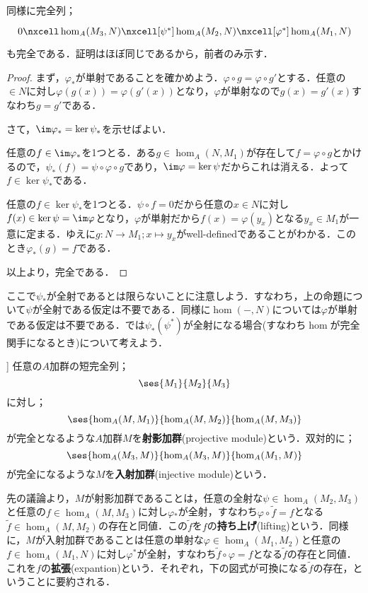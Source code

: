 同様に完全列；
\[\begin{tikzcd}
0\nxcell\hom_A(M_3,N)\nxcell[\psi^\ast]\hom_A(M_2,N)\nxcell[\varphi^\ast]\hom_A(M_1,N)
\end{tikzcd}\]
も完全である．証明はほぼ同じであるから，前者のみ示す．
\begin{proof}
	まず，$\varphi_\ast $が単射であることを確かめよう．$\varphi\circ g=\varphi\circ g'$とする．任意の$\in N$に対し$\varphi(g(x))=\varphi(g'(x))$となり，$\varphi$が単射なので$g(x)=g'(x)$すなわち$g=g'$である．
	
	さて，$\im\varphi_\ast =\ker\psi_\ast $を示せばよい．
	\begin{mrkw}
		\item 
		任意の$f\in\im\varphi_\ast$を1つとる．ある$g\in\hom_A(N,M_1)$が存在して$f=\varphi\circ g$とかけるので，$\psi_\ast (f)=\psi\circ\varphi\circ g$であり，$\im\varphi=\ker\psi$だからこれは消える．よって$f\in\ker\psi_\ast $である．
		\item 
		任意の$f\in\ker\psi_\ast $を1つとる．$\psi\circ f=0$だから任意の$x\in N$に対し$f(x)\in\ker\psi=\im\varphi$となり，$\varphi$が単射だから$f(x)=\varphi(y_x)$となる$y_x\in M_1$が一意に定まる．ゆえに$g:N\to M_1;x\mapsto y_x$がwell-definedであることがわかる．このとき$\varphi_\ast (g)=f$である．
	\end{mrkw}
	以上より，完全である．
\end{proof}

ここで$\psi_\ast $が全射であるとは限らないことに注意しよう．すなわち，上の命題について$\psi$が全射である仮定は不要である．同様に$\hom(-,N)$については$\varphi$が単射である仮定は不要である．では$\psi_\ast(\psi^\ast)$が全射になる場合(すなわち$\hom$が完全関手になるとき)について考えよう．
\begin{defi}
	]
	任意の$A$加群の短完全列；
	\[\ses{M_1}{M_2}{M_3}\]
	に対し；
	\[\ses{\hom_A(M,M_1)}{\hom_A(M,M_2)}{\hom_A(M,M_3)}\]
	が完全となるような$A$加群$M$を\textbf{射影加群}(projective module)という．双対的に；
	\[\ses{\hom_A(M_3,M)}{\hom_A(M_3,M)}{\hom_A(M_1,M)}\]
	が完全になるような$M$を\textbf{入射加群}(injective module)という．
\end{defi}

先の議論より，$M$が射影加群であることは，任意の全射な$\psi\in\hom_A(M_2,M_3)$と任意の$f\in\hom_A(M,M_3)$に対し$\varphi{}_\ast $が全射，すなわち$\varphi\circ\widetilde{f}=f$となる$\widetilde{f}\in\hom_A(M,M_2)$の存在と同値．この$\widetilde{f}$を$f$の\textbf{持ち上げ}(lifting)という．同様に，$M$が入射加群であることは任意の単射な$\varphi\in\hom_A(M_1,M_2)$と任意の$f\in\hom_A(M_1,N)$に対し$\varphi^\ast $が全射，すなわち$\widetilde{f}\circ\varphi=f$となる$\widetilde{f}$の存在と同値．これを$f$の\textbf{拡張}(expantion)という．それぞれ，下の図式が可換になる$\widetilde{f}$の存在，ということに要約される．

